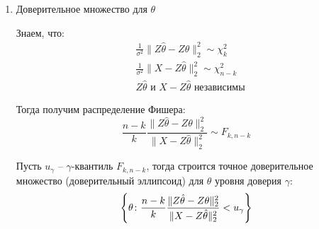 \begin{enumerate}
    \item Доверительное множество для $\theta$

    Знаем, что:
    \begin{align*}
        & \frac{1}{\sigma^2} \|Z \hat{\theta} - Z \theta\|_2^2 \sim \chi^2_k
        \\
        & \frac{1}{\sigma^2} \|X - Z\hat{\theta}\|_2^2 \sim \chi^2_{n-k}
        \\
        & Z \hat{\theta} \text{ и } X - Z \hat{\theta} \text{ независимы}
    \end{align*}

    Тогда получим распределение Фишера:
    \[
        \frac{n-k}{k} \frac{\|Z \hat{\theta} - Z \theta\|_2^2}{\|X - Z\hat{\theta}\|_2^2} \sim F_{k, n-k}
    \]

    Пусть $u_\gamma$ -- $\gamma$-квантиль $F_{k, n-k}$, тогда строится точное доверительное множество (доверительный эллипсоид) для $\theta$ уровня доверия $\gamma$:
    \[
        \left\{\theta \colon \frac{n-k}{k} \frac{\|Z \hat{\theta} - Z \theta\|_2^2}{\|X - Z\hat{\theta}\|_2^2} < u_{\gamma}\right\}
    \]
\end{enumerate}
